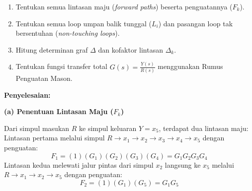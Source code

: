 \documentclass[11pt,a4paper]{article}
\begin{document}
\begin{center}
\end{center}

\begin{enumerate}[label=(\alph*)]
    \item Tentukan semua lintasan maju (\textit{forward paths}) beserta penguatannya ($F_k$).
    \item Tentukan semua loop umpan balik tunggal ($L_i$) dan pasangan loop tak bersentuhan (\textit{non-touching loops}).
    \item Hitung determinan graf $\Delta$ dan kofaktor lintasan $\Delta_k$.
    \item Tentukan fungsi transfer total $G(s) = \frac{Y(s)}{R(s)}$ menggunakan Rumus Penguatan Mason.
\end{enumerate}

\textbf{Penyelesaian:}

\textbf{(a) Penentuan Lintasan Maju ($F_k$)}

Dari simpul masukan $R$ ke simpul keluaran $Y = x_5$, terdapat dua lintasan maju:
Lintasan pertama melalui simpul $R \to x_1 \to x_2 \to x_3 \to x_4 \to x_5$ dengan penguatan:
$$F_1 = (1)(G_1)(G_2)(G_3)(G_4) = G_1 G_2 G_3 G_4$$
Lintasan kedua melewati jalur pintas dari simpul $x_2$ langsung ke $x_5$ melalui $R \to x_1 \to x_2 \to x_5$ dengan penguatan:
$$F_2 = (1)(G_1)(G_5) = G_1 G_5$$
\end{document}

